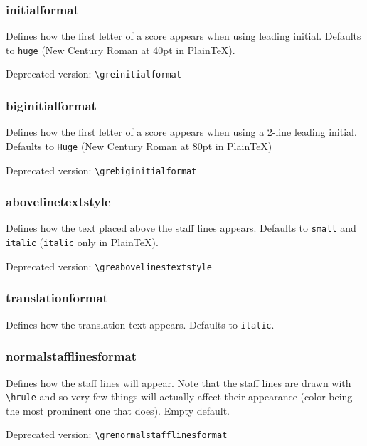 \subsubsection*{initialformat}
Defines how the first letter of a score appears when using leading
initial.  Defaults to \verb=huge= (New Century Roman at 40pt in
Plain\TeX).

\smallskip\indent Deprecated version: \verb=\greinitialformat=

\subsubsection*{biginitialformat}
Defines how the first letter of a score appears when using a 2-line
leading initial.  Defaults to \verb=Huge= (New Century Roman at 80pt
in Plain\TeX)

\smallskip\indent Deprecated version: \verb=\grebiginitialformat=

\subsubsection*{abovelinetextstyle}
Defines how the text placed above the staff lines appears.  Defaults
to \verb=small= and \verb=italic= (\verb=italic= only in Plain\TeX).

\smallskip\indent Deprecated version: \verb=\greabovelinestextstyle=

\subsubsection*{translationformat}
Defines how the translation text appears.  Defaults to \verb=italic=.

\subsubsection*{normalstafflinesformat}
Defines how the staff lines will appear.  Note that the staff lines
are drawn with \verb=\hrule= and so very few things will actually
affect their appearance (color being the most prominent one that
does).  Empty default.

\smallskip\indent Deprecated version: \verb=\grenormalstafflinesformat=


